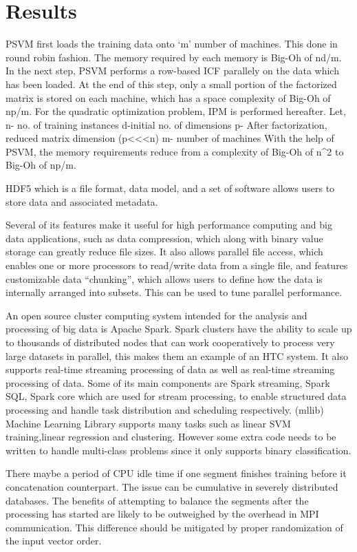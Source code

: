 \documentclass[aps,floatfix,prd,showpacs]{revtex4}
\begin{document}
\section{Results}
PSVM first loads the training data onto ‘m’ number of machines. This done in round robin fashion. The memory required by each memory is Big-Oh of nd/m. In the next step, PSVM performs a row-based ICF parallely on the data which has been loaded. At the end of this step, only a small portion of the factorized matrix is stored on each machine, which has a space complexity of Big-Oh of np/m. For the quadratic optimization problem, IPM is performed hereafter. Let, n- no. of training instances d-initial no. of dimensions p- After factorization, reduced matrix dimension (p<<<n) m- number of machines With the help of PSVM, the memory requirements reduce from a complexity of Big-Oh of n^2 to Big-Oh of np/m.  
 
HDF5 which is a file format, data model, and a set of software allows users to store data and associated metadata. 

Several of its features make it useful for high performance computing and big data applications, such as data compression, which along with binary value storage can greatly reduce file sizes. It also allows parallel file access, which enables one or more processors to read/write data from a single file, and features customizable data “chunking”, which allows users to define how the data is internally arranged into subsets. This can be used to tune parallel performance. 

An open source cluster computing system intended for the analysis and processing of big data is Apache Spark. Spark clusters have the ability to scale up to thousands of distributed nodes that can work cooperatively to process very large datasets in parallel, this makes them an example of an HTC system. It also supports real-time streaming processing of data as well as real-time streaming processing of data. Some of its main components are Spark streaming, Spark SQL, Spark core which are used for stream processing, to enable structured data processing and handle task distribution and scheduling respectively. (mllib) Machine Learning Library supports many tasks such as linear SVM training,linear regression and clustering. However some extra code needs to be written to handle multi-class problems since it only supports binary classification. 
 
There maybe a period of CPU idle time if one segment finishes training before it concatenation counterpart. The issue can be cumulative in severely distributed databases. The benefits of attempting to balance the segments after the processing has started are likely to be outweighed by the overhead in MPI communication. This difference should be mitigated by proper randomization of the input vector order. 
 
\end{document}
